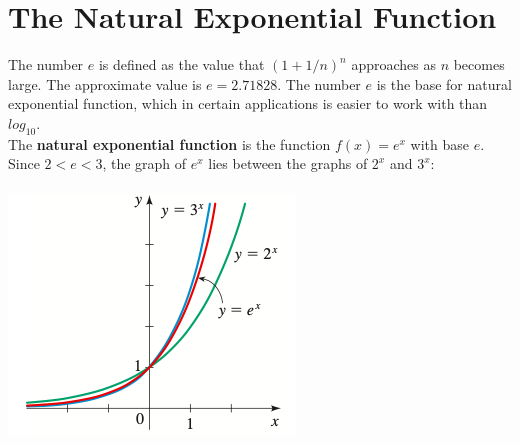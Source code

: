 \documentclass{book}
\begin{document}
	 \section{The Natural Exponential Function}
	 The number $e$ is defined as the value that $(1+1/n)^n$ approaches as $n$ becomes large. The approximate value is $e = 2.71828$. The number $e$ is the base for natural exponential function, which in certain applications is easier to work with than $log_{10}$. \\
	 The \textbf{natural exponential function} is the function $f(x) = e^x$ with base $e$. Since $2 < e < 3$, the graph of $e^x$ lies between the graphs of $2^x$ and $3^x$:\\
	 \\
	 \includegraphics[scale=0.8]{exp4}
	
\end{document}
